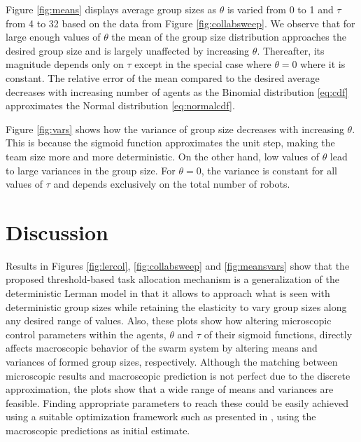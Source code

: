 \documentclass{TeXstyles/DARS/svmult}  %
\begin{document}
Figure \ref{fig:means} displays average group sizes as $\theta$ is varied from 0 to 1 and $\tau$ from 4 to 32 based on the data from Figure \ref{fig:collabsweep}. We observe that for large enough values of $\theta$ the mean of the group size distribution approaches the desired group size and is largely unaffected by increasing $\theta$. Thereafter, its magnitude depends only on $\tau$ except in the special case where $\theta = 0$ where it is constant. The relative error of the mean compared to the desired average decreases with increasing number of agents as the  Binomial distribution \eqref{eq:cdf}
approximates the Normal distribution \eqref{eq:normalcdf}.

Figure \ref{fig:vars} shows how the variance of group size decreases with increasing $\theta$. This is because the sigmoid function approximates the unit step, making the team size more and more deterministic. On the other hand, low values of $\theta$ lead to large variances in the group size. For $\theta=0$, the variance is constant for all values of $\tau$ and depends exclusively on the total number of robots. 






\section{Discussion}\label{sec:discussion}
Results in Figures \ref{fig:lercol}, \ref{fig:collabsweep} and \ref{fig:meansvars} show that the proposed threshold-based task allocation mechanism is a generalization of the deterministic Lerman model in that it allows to approach what is seen with deterministic group sizes while retaining the elasticity to vary group sizes along any desired range of values. Also, these plots show how altering microscopic control parameters within the agents, $\theta$ and $\tau$ of their sigmoid functions, directly affects macroscopic behavior of the swarm system by altering means and variances of formed group sizes, respectively. Although the matching between microscopic results and macroscopic prediction is not perfect due to the discrete approximation, the plots show that a wide range of means and variances are feasible. Finding appropriate parameters to reach these could be easily achieved using a suitable optimization framework such as presented in \cite{Correll2008,Berman2009}, using the macroscopic predictions as initial estimate. 
\end{document}
